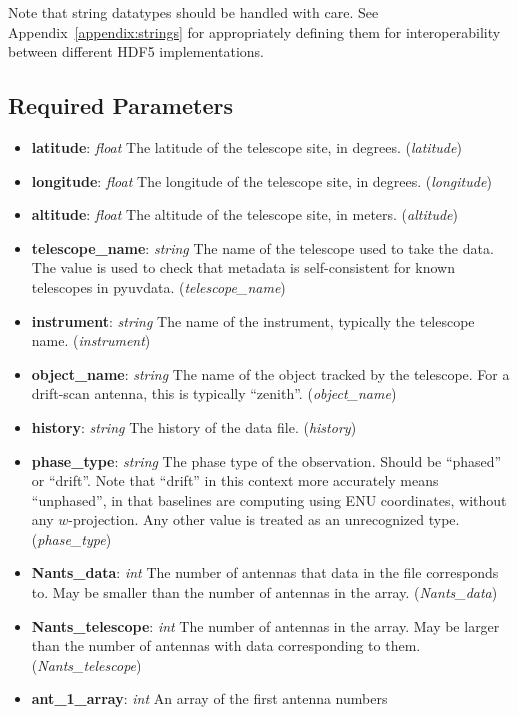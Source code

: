 \documentclass[11pt, oneside]{article}
\begin{document}
Note that string datatypes should be handled with care. See
Appendix~\ref{appendix:strings} for appropriately defining them for
interoperability between different HDF5 implementations.

\subsection{Required Parameters}
\label{sec:req_params}
\begin{itemize}
\item \textbf{latitude}: \textit{float} The latitude of the telescope site, in
  degrees. (\textit{latitude})
\item \textbf{longitude}: \textit{float} The longitude of the telescope site, in
  degrees. (\textit{longitude})
\item \textbf{altitude}: \textit{float} The altitude of the telescope site, in
  meters. (\textit{altitude})
\item \textbf{telescope\_name}: \textit{string} The name of the telescope used
  to take the data. The value is used to check that metadata is self-consistent
  for known telescopes in pyuvdata. (\textit{telescope\_name})
\item \textbf{instrument}: \textit{string} The name of the instrument, typically
  the telescope name. (\textit{instrument})
\item \textbf{object\_name}: \textit{string} The name of the object tracked by
  the telescope. For a drift-scan antenna, this is typically
  ``zenith''. (\textit{object\_name})
\item \textbf{history}: \textit{string} The history of the data
  file. (\textit{history})
\item \textbf{phase\_type}: \textit{string} The phase type of the
  observation. Should be ``phased'' or ``drift''. Note that ``drift'' in this
  context more accurately means ``unphased'', in that baselines are computing
  using ENU coordinates, without any $w$-projection. Any other value is treated as
  an unrecognized type. (\textit{phase\_type})
\item \textbf{Nants\_data}: \textit{int} The number of antennas that data in the
  file corresponds to. May be smaller than the number of antennas in the
  array. (\textit{Nants\_data})
\item \textbf{Nants\_telescope}: \textit{int} The number of antennas in the
  array. May be larger than the number of antennas with data corresponding to
  them. (\textit{Nants\_telescope})
\item \textbf{ant\_1\_array}: \textit{int} An array of the first antenna numbers

\end{itemize}
\end{document}
